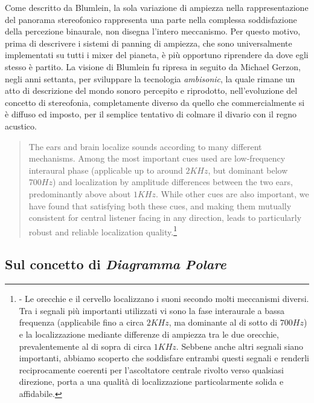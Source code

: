 Come descritto da Blumlein, la sola variazione di ampiezza nella
rappresentazione del panorama stereofonico rappresenta una parte nella complessa
soddisfazione della percezione binaurale, non disegna l'intero meccanismo.
Per questo motivo, prima di descrivere i sistemi di panning di ampiezza, che
sono universalmente implementati su tutti i mixer del pianeta, è più opportuno
riprendere da dove egli stesso è partito. La visione di Blumlein fu ripresa in
seguito da Michael Gerzon, negli anni settanta, per sviluppare la tecnologia
\emph{ambisonic}, la quale rimane un atto di descrizione del mondo sonoro
percepito e riprodotto, nell'evoluzione del concetto di stereofonia, completamente diverso
da quello che commercialmente si è diffuso ed imposto, per il semplice tentativo
di colmare il divario con il regno acustico.

\begin{quote}
The ears and brain localize sounds according to many different mechanisms. Among
the most important cues used are low-frequency interaural phase (applicable up
to around $2KHz$, but dominant below $700Hz$) and localization by
amplitude differences between the two ears, predominantly above about
$1KHz$. While other cues are also important, we have found that satisfying
both these cues, and making them mutually consistent for central listener facing
in any direction, leads to particularly robust and reliable localization
quality.\footnote{\cite{mg92pdmsss} - Le orecchie e il cervello localizzano i
suoni secondo molti meccanismi diversi. Tra i segnali più importanti utilizzati
vi sono la fase interaurale a bassa frequenza (applicabile fino a circa $2KHz$,
ma dominante al di sotto di $700Hz$) e la localizzazione mediante
differenze di ampiezza tra le due orecchie, prevalentemente al di sopra di
circa $1KHz$. Sebbene anche altri segnali siano importanti, abbiamo
scoperto che soddisfare entrambi questi segnali e renderli reciprocamente
coerenti per l'ascoltatore centrale rivolto verso qualsiasi direzione, porta
a una qualità di localizzazione particolarmente solida e affidabile.}
\end{quote}

\subsection{Sul concetto di \emph{Diagramma Polare}}
\label{sec:polarplot}

